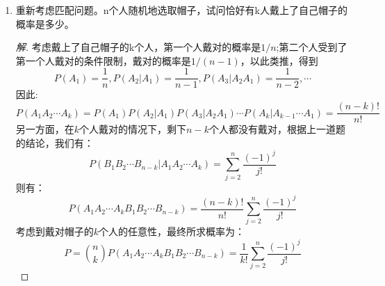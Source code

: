 \documentclass[12pt]{article}
\newcommand{\hei}{\CJKfamily{hei}}                          %
\begin{document}
\begin{enumerate}
\item {\hei 重新考虑匹配问题。n个人随机地选取帽子，试问恰好有k人戴上了自己帽子的概率是多少。}
\begin{proof}[解]
	考虑戴上了自己帽子的k个人，第一个人戴对的概率是$1/n$;第二个人受到了第一个人戴对的条件限制，戴对的概率是$1/(n−1)$，以此类推，得到
	\begin{equation}
	P(A_1)=\frac{1}{n},P(A_2|A_1)=\frac{1}{n-1},P(A_3|A_2A_1)=\frac{1}{n-2},\cdots
	\end{equation}
	因此:
	\begin{equation}
	P(A_1A_2\cdots A_k)=P(A_1)P(A_2|A_1)P(A_3|A_2A_1)\cdots P(A_k|A_{k-1}\cdots A_1)=\frac{(n-k)!}{n!}
	\end{equation}
	另一方面，在$k$个人戴对的情况下，剩下$n-k$个人都没有戴对，根据上一道题的结论，我们有：
	\begin{equation}
	P(B_1B_2\cdots B_{n-k}|A_1A_2\cdots A_k)=\sum_{j=2}^{n}\frac{(-1)^{j}}{j!}
	\end{equation}
	则有：
	\begin{equation}
	P(A_1A_2\cdots A_kB_1B_2\cdots B_{n-k})=\frac{(n-k)!}{n!}\sum_{j=2}^{n}\frac{(-1)^{j}}{j!}
	\end{equation}
	考虑到戴对帽子的$k$个人的任意性，最终所求概率为：
	\begin{equation}
	P=\binom{n}{k}P(A_1A_2\cdots A_kB_1B_2\cdots B_{n-k})=\frac{1}{k!}\sum_{j=2}^{n}\frac{(-1)^{j}}{j!}
	\end{equation}
\end{proof}


\end{enumerate}
\end{document}
